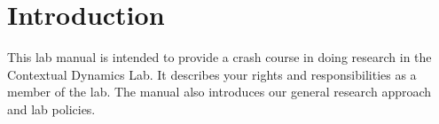 \documentclass{tufte-book} %
\begin{document}




\newcommand{\director}{Jeremy}
\newcommand{\coordinator}{\director}
\newcommand{\labmeetingtime}{Mondays at 1:15pm}
\newcommand{\meeting}{\href{https:context-lab.youcanbook.me}{YouCanBook.me}}

\cleardoublepage
\chapter{Introduction}\label{ch:intro} %
This lab manual is intended to provide a crash course in doing
research in the Contextual Dynamics Lab.  It describes your rights and
responsibilities as a member of the lab.  The manual also introduces
our general research approach and lab policies.

\end{document}
